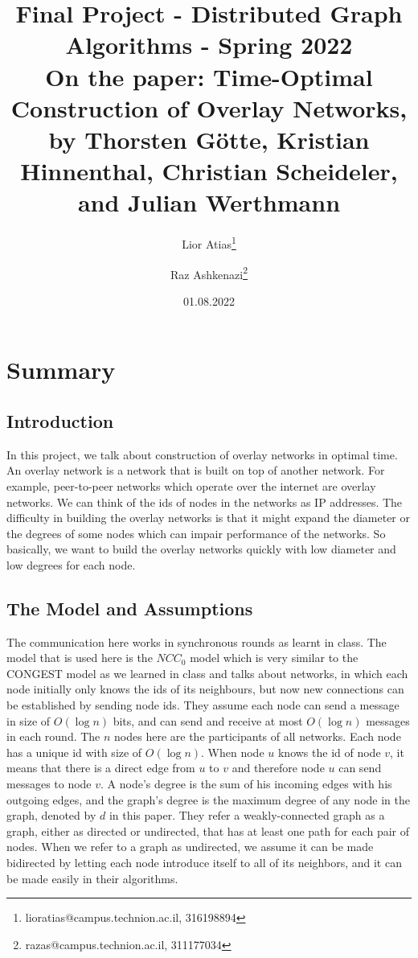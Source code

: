 \documentclass[11pt]{article}
\begin{document}
\title{Final Project - Distributed Graph Algorithms - Spring 2022\\
On the paper: Time-Optimal Construction of Overlay Networks, 
by Thorsten Götte, Kristian Hinnenthal, Christian Scheideler, and Julian Werthmann
}
\author{Lior Atias\footnote{lioratias@campus.technion.ac.il, 316198894} \and Raz Ashkenazi\footnote{razas@campus.technion.ac.il, 311177034}
}
\date{01.08.2022}
	\maketitle
\section{Summary}
\subsection{Introduction}
In this project, we talk about construction of overlay networks in optimal time. An overlay network is a network that is built on top of another network. For example, peer-to-peer networks which operate over the internet are overlay networks. We can think of the ids of nodes in the networks as IP addresses. The difficulty in building the overlay networks is that it might expand the diameter or the degrees of some nodes which can impair performance of the networks. So basically, we want to build the overlay networks quickly with low diameter and low degrees for each node.

\subsection{The Model and Assumptions}
The communication here works in synchronous rounds as learnt in class. The model that is used here is the $NCC_{0}$ model which is very similar to the CONGEST model as we learned in class and talks about networks, in which each node initially only knows the ids of its neighbours, but now new connections can be established by sending node ids. They assume each node can send a message in size of $O(\log{n})$ bits, and can send and receive at most $O(\log{n})$ messages in each round. The $n$ nodes here are the participants of all networks. Each node has a unique id with size of $O(\log{n})$. When node $u$ knows the id of node $v$, it means that there is a direct edge from $u$ to $v$ and therefore node $u$ can send messages to node $v$. A node's degree is the sum of his incoming edges with his outgoing edges, and the graph's degree is the maximum degree of any node in the graph, denoted by $d$ in this paper. They refer a weakly-connected graph as a graph, either as directed or undirected, that has at least one path for each pair of nodes. When we refer to a graph as undirected, we assume it can be made bidirected by letting each node introduce itself to all of its neighbors, and it can be made easily in their algorithms.
\end{document}
